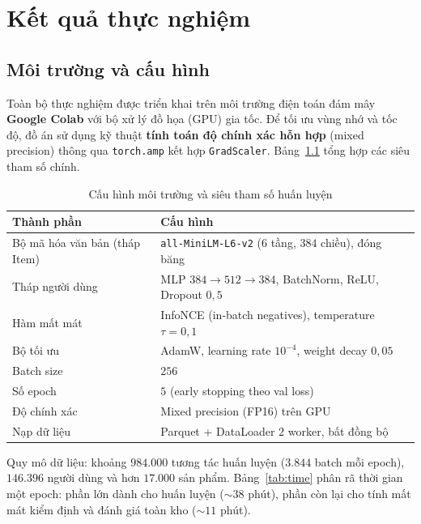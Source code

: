 \chapter{Kết quả thực nghiệm}
\label{chap:exp}

\section{Môi trường và cấu hình}

Toàn bộ thực nghiệm được triển khai trên môi trường điện toán đám mây
\textbf{Google Colab} với bộ xử lý đồ họa (GPU) gia tốc. Để tối ưu vùng nhớ và tốc
độ, đồ án sử dụng kỹ thuật \textbf{tính toán độ chính xác hỗn hợp} (mixed precision)
thông qua \texttt{torch.amp} kết hợp \texttt{GradScaler}. Bảng~\ref{tab:hyper} tổng
hợp các siêu tham số chính.

\begin{table}[H]
\centering
\caption{Cấu hình môi trường và siêu tham số huấn luyện}
\label{tab:hyper}
\renewcommand{\arraystretch}{1.3}
\begin{tabularx}{\textwidth}{@{}l X@{}}
\toprule
\textbf{Thành phần} & \textbf{Cấu hình} \\
\midrule
Bộ mã hóa văn bản (tháp Item) & \texttt{all-MiniLM-L6-v2} ($6$ tầng, $384$ chiều), đóng băng \\
Tháp người dùng & MLP $384{\to}512{\to}384$, BatchNorm, ReLU, Dropout $0{,}5$ \\
Hàm mất mát & InfoNCE (in-batch negatives), temperature $\tau = 0{,}1$ \\
Bộ tối ưu & AdamW, learning rate $10^{-4}$, weight decay $0{,}05$ \\
Batch size & $256$ \\
Số epoch & $5$ (early stopping theo val loss) \\
Độ chính xác & Mixed precision (FP16) trên GPU \\
Nạp dữ liệu & Parquet + DataLoader $2$ worker, bất đồng bộ \\
\bottomrule
\end{tabularx}
\end{table}

Quy mô dữ liệu: khoảng $984.000$ tương tác huấn luyện ($3.844$ batch mỗi epoch),
$146.396$ người dùng và hơn $17.000$ sản phẩm. Bảng~\ref{tab:time} phân rã thời gian
một epoch: phần lớn dành cho huấn luyện ($\sim 38$ phút), phần còn lại cho tính mất
mát kiểm định và đánh giá toàn kho ($\sim 11$ phút).

